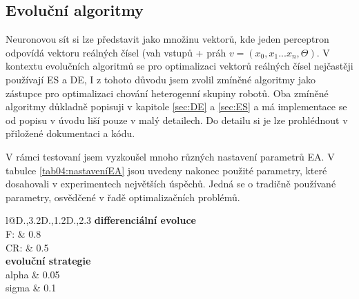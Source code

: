 \subsection*{Evoluční algoritmy}
Neuronovou sít si lze představit jako množinu vektorů, kde jeden perceptron odpovídá vektoru reálných čísel (vah vstupů + práh $v =(x_0,x_1...x_n,\Theta)$. V kontextu evolučních algoritmů se pro optimalizaci vektorů reálných čísel nejčastěji používají ES a DE, I z tohoto důvodu jsem zvolil zmíněné algoritmy jako zástupce pro optimalizaci chování heterogenní skupiny robotů. Oba zmíněné algoritmy důkladně popisuji v kapitole \ref{sec:DE} a \ref{sec:ES} a má implementace se od popisu v úvodu liší pouze v malý detailech. Do detailu si je lze prohlédnout v přiložené dokumentaci a kódu. 
\par
V rámci testovaní jsem vyzkoušel mnoho různých nastavení parametrů EA. V tabulce \ref{tab04:nastaveníEA} jsou uvedeny nakonec použité parametry, které dosahovali v experimentech největších úspěchů. Jedná se o tradičně používané parametry, osvědčené v řadě optimalizačních problémů. 
\begin{table}[h]\centering
	\begin{tabular}{l@{\hspace{1.5cm}}D{.}{,}{3.2}D{.}{,}{1.2}D{.}{,}{2.3}}
		\toprule
		 \textbf{differenciální evoluce}\\
		\midrule
		F:     & 0.8 \\
		CR:  & 0.5 \\
		\toprule
		\textbf{evoluční strategie}\\
		\midrule
		alpha & 0.05 \\
		sigma & 0.1\\
		\bottomrule
	\end{tabular}
	\caption{Nastavení parametrů u EA}
	\label{tab04:nastaveníEA}
\end{table}
\newpage
